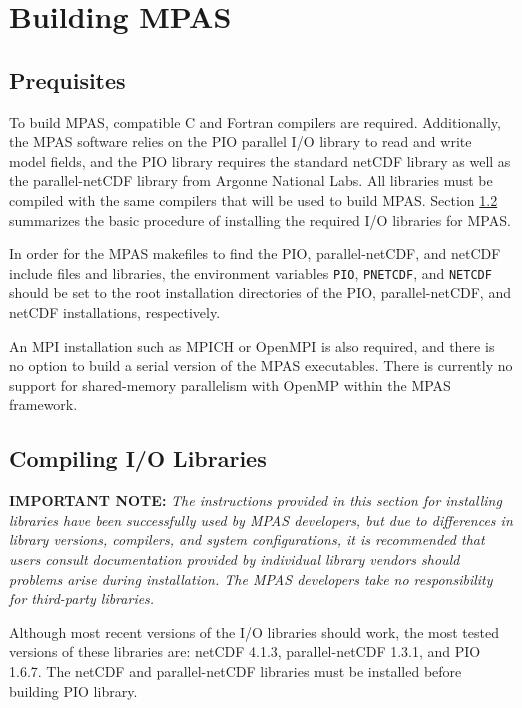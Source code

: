 \chapter{Building MPAS}
\label{chap:mpas_build_instructions}

\section{Prequisites}
\label{build_prerequisites}

To build MPAS, compatible C and Fortran compilers are required. Additionally,
the MPAS software relies on the PIO parallel I/O library to read and write model
fields, and the PIO library requires the standard netCDF library as well as the
parallel-netCDF library from Argonne National Labs. All libraries must be
compiled with the same compilers that will be used to build MPAS. Section
\ref{sec:build_io} summarizes the basic procedure of installing the required I/O
libraries for MPAS.

In order for the MPAS makefiles to find the PIO, parallel-netCDF, and netCDF
include files and libraries, the environment variables {\tt PIO}, {\tt PNETCDF},
and {\tt NETCDF} should be set to the root installation directories of the PIO,
parallel-netCDF, and netCDF installations, respectively. 

An MPI installation such as MPICH or OpenMPI is also required, and there is no
option to build a serial version of the MPAS executables. There is currently no
support for shared-memory parallelism with OpenMP within the MPAS framework.


\section{Compiling I/O Libraries}
\label{sec:build_io}

{\bf IMPORTANT NOTE:} {\em The instructions provided in this section for
installing libraries have been successfully used by MPAS developers, but due to
differences in library versions, compilers, and system configurations, it is
recommended that users consult documentation provided by individual library
vendors should problems arise during installation. The MPAS developers take no
responsibility for third-party libraries.} \vspace{12pt}

Although most recent versions of the I/O libraries should work, the most tested
versions of these libraries are: netCDF 4.1.3, parallel-netCDF 1.3.1, and PIO
1.6.7. The netCDF and parallel-netCDF libraries must be installed before
building PIO library.

